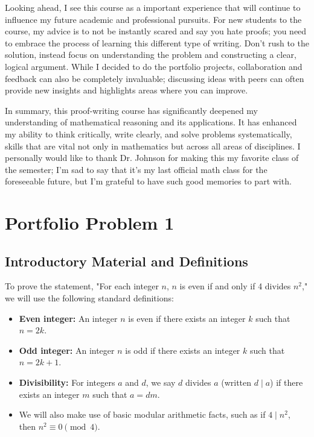 \documentclass[12pt]{article}
\theoremstyle{definition}
\begin{document}
Looking ahead, I see this course as a important experience that will continue to influence my future academic and professional pursuits. For new students to the course, my advice is to not be instantly scared and say you hate proofs; you need to embrace the process of learning this different type of writing. Don’t rush to the solution, instead focus on understanding the problem and constructing a clear, logical argument. While I decided to do the portfolio projects, collaboration and feedback can also be completely invaluable; discussing ideas with peers can often provide new insights and highlights areas where you can improve.

In summary, this proof-writing course has significantly deepened my understanding of mathematical reasoning and its applications. It has enhanced my ability to think critically, write clearly, and solve problems systematically, skills that are vital not only in mathematics but across all areas of disciplines. I personally would like to thank Dr. Johnson for making this my favorite class of the semester; I'm sad to say that it's my last official math class for the foreseeable future, but I'm grateful to have such good memories to part with.

\newpage


\section{Portfolio Problem 1}

\subsection{Introductory Material and Definitions} 

To prove the statement, "For each integer \( n \), \( n \) is even if and only if 4 divides \( n^2 \)," we will use the following standard definitions:

\begin{itemize}
    \item \textbf{Even integer:} An integer \( n \) is even if there exists an integer \( k \) such that \( n = 2k \).
    \item \textbf{Odd integer:} An integer \( n \) is odd if there exists an integer \( k \) such that \( n = 2k + 1 \).
    \item \textbf{Divisibility:} For integers \( a \) and \( d \), we say \( d \) divides \( a \) (written \( d \mid a \)) if there exists an integer \( m \) such that \( a = dm \).
    \item We will also make use of basic modular arithmetic facts, such as if \( 4 \mid n^2 \), then \( n^2 \equiv 0 \pmod{4} \).
\end{itemize}
\end{document}
